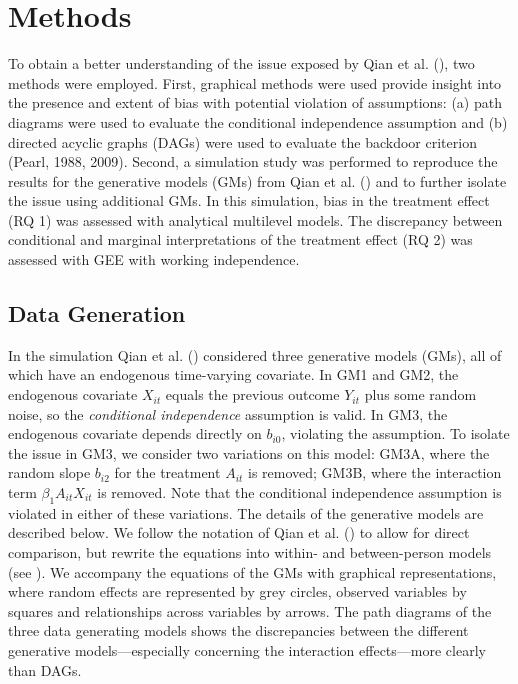 \documentclass[
  12pt,
  a4paper,
]{article}
\begin{document}
\section{Methods}\label{methods}

To obtain a better understanding of the issue exposed by Qian et al.
(), two methods were employed. First,
graphical methods were used provide insight into the presence and extent
of bias with potential violation of assumptions: (a) path diagrams were
used to evaluate the conditional independence assumption and (b)
directed acyclic graphs (DAGs) were used to evaluate the backdoor
criterion (Pearl, 1988, 2009). Second, a simulation study was performed
to reproduce the results for the generative models (GMs) from Qian et
al. () and to further isolate the issue
using additional GMs. In this simulation, bias in the treatment effect
(RQ 1) was assessed with analytical multilevel models. The discrepancy
between conditional and marginal interpretations of the treatment effect
(RQ 2) was assessed with GEE with working independence.

\subsection{Data Generation}\label{data-generation}

In the simulation Qian et al. () considered
three generative models (GMs), all of which have an endogenous
time-varying covariate. In GM1 and GM2, the endogenous covariate
\(X_{it}\) equals the previous outcome \(Y_{it}\) plus some random
noise, so the \emph{conditional independence} assumption is valid. In
GM3, the endogenous covariate depends directly on \(b_{i0}\), violating
the assumption. To isolate the issue in GM3, we consider two variations
on this model: GM3A, where the random slope \(b_{i2}\) for the treatment
\(A_{it}\) is removed; GM3B, where the interaction term
\(\beta_1 A_{it} X_{it}\) is removed. Note that the conditional
independence assumption is violated in either of these variations. The
details of the generative models are described below. We follow the
notation of Qian et al. () to allow for
direct comparison, but rewrite the equations into within- and
between-person models (see ). We accompany the equations of the GMs with graphical
representations, where random effects are represented by grey circles,
observed variables by squares and relationships across variables by
arrows. The path diagrams of the three data generating models shows the
discrepancies between the different generative models---especially
concerning the interaction effects---more clearly than DAGs.
\end{document}

